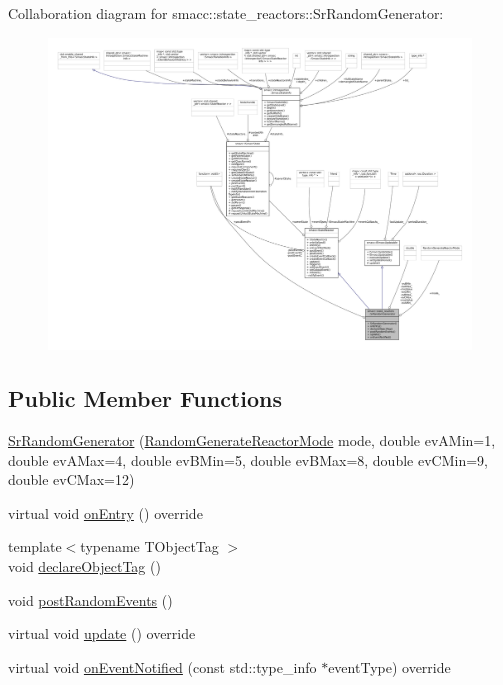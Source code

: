 Collaboration diagram for smacc\+:\+:state\+\_\+reactors\+:\+:Sr\+Random\+Generator\+:
\nopagebreak
\begin{figure}[H]
\begin{center}
\leavevmode
\includegraphics[width=350pt]{classsmacc_1_1state__reactors_1_1SrRandomGenerator__coll__graph}
\end{center}
\end{figure}
\subsection*{Public Member Functions}
\begin{DoxyCompactItemize}
\item 
\hyperlink{classsmacc_1_1state__reactors_1_1SrRandomGenerator_a3aef4d193f072566e2372a2497f2ea5b}{Sr\+Random\+Generator} (\hyperlink{namespacesmacc_1_1state__reactors_a038f8e362ad6d35494c940ee4c97a52e}{Random\+Generate\+Reactor\+Mode} mode, double ev\+A\+Min=1, double ev\+A\+Max=4, double ev\+B\+Min=5, double ev\+B\+Max=8, double ev\+C\+Min=9, double ev\+C\+Max=12)
\item 
virtual void \hyperlink{classsmacc_1_1state__reactors_1_1SrRandomGenerator_a093fa3de1ca4f84c74cc0cb0f093cb31}{on\+Entry} () override
\item 
{\footnotesize template$<$typename T\+Object\+Tag $>$ }\\void \hyperlink{classsmacc_1_1state__reactors_1_1SrRandomGenerator_a3c8db60268bcffc709a482f2cf302d41}{declare\+Object\+Tag} ()
\item 
void \hyperlink{classsmacc_1_1state__reactors_1_1SrRandomGenerator_a50638c93ca9444fbeecea6e72bc6ac35}{post\+Random\+Events} ()
\item 
virtual void \hyperlink{classsmacc_1_1state__reactors_1_1SrRandomGenerator_adf6e20208210f30639b92214e1dda83b}{update} () override
\item 
virtual void \hyperlink{classsmacc_1_1state__reactors_1_1SrRandomGenerator_a8635347245b76d17355fe374e854144f}{on\+Event\+Notified} (const std\+::type\+\_\+info $\ast$event\+Type) override
\end{DoxyCompactItemize}
